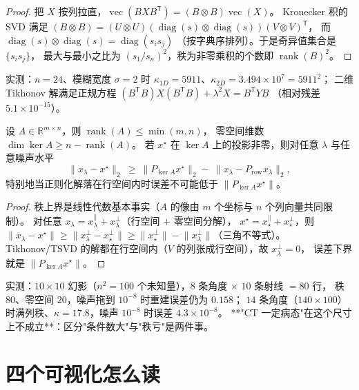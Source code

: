 \begin{proof}
把 $X$ 按列拉直，$\operatorname{vec}(BX B^{\mathsf T})=(B\otimes B)\operatorname{vec}(X)$。
Kronecker 积的 SVD 满足 $(B\otimes B)=(U\otimes U)(\operatorname{diag}(s)\otimes\operatorname{diag}(s))(V\otimes V)^{\mathsf T}$，
而 $\operatorname{diag}(s)\otimes\operatorname{diag}(s)=\operatorname{diag}(s_is_j)$
（按字典序排列）。于是奇异值集合是 $\{s_is_j\}$，
最大与最小之比为 $(s_1/s_n)^2$，秩为非零乘积的个数即 $\operatorname{rank}(B)^2$。
\end{proof}

实测：$n=24$、模糊宽度 $\sigma=2$ 时 $\kappa_{1D}=5911$、$\kappa_{2D}=3.494\times10^7=5911^2$；
二维 Tikhonov 解满足正规方程 $(B^{\mathsf T}B)X(B^{\mathsf T}B)+\lambda^2X=B^{\mathsf T}YB$
（相对残差 $5.1\times10^{-15}$）。

\begin{theorem}[投影算子的秩上界与零空间误差地板]
\label{thm:rank}
设 $A\in\mathbb{R}^{m\times n}$，则 $\operatorname{rank}(A)\le\min(m,n)$，
零空间维数 $\dim\ker A\ge n-\operatorname{rank}(A)$。
若 $x^\star$ 在 $\ker A$ 上的投影非零，则对任意 $\lambda$ 与任意噪声水平
\[
  \lVert x_\lambda-x^\star\rVert_2\ \ge\ \lVert P_{\ker A}x^\star\rVert_2
  -\ \lVert x_\lambda-P_{\operatorname{row}}x_\lambda\rVert_2 ,
\]
特别地当正则化解落在行空间内时误差不可能低于 $\lVert P_{\ker A}x^\star\rVert$。
\end{theorem}

\begin{proof}
秩上界是线性代数基本事实（$A$ 的像由 $m$ 个坐标与 $n$ 个列向量共同限制）。
对任意 $x_\lambda=x_\lambda^{\parallel}+x_\lambda^{\perp}$（行空间 $+$ 零空间分解），
$x^\star=x^{\parallel}_\star+x^\perp_\star$，则
$\lVert x_\lambda-x^\star\rVert\ge\lVert x_\lambda^\perp-x^\perp_\star\rVert
\ge\lVert x^\perp_\star\rVert-\lVert x^\perp_\lambda\rVert$（三角不等式）。
Tikhonov/TSVD 的解都在行空间内（$V$ 的列张成行空间），故 $x^\perp_\lambda=0$，
误差下界就是 $\lVert P_{\ker A}x^\star\rVert$。
\end{proof}

实测：$10\times10$ 幻影（$n^2=100$ 个未知量），$8$ 条角度 $\times$ $10$ 条射线 $=80$ 行，
秩 $80$、零空间 $20$，噪声拖到 $10^{-8}$ 时重建误差仍为 $0.158$；
$14$ 条角度（$140\times100$）时满列秩、$\kappa=17.8$，噪声 $10^{-8}$ 时误差 $4.3\times10^{-8}$。
**"CT 一定病态"在这个尺寸上不成立**：区分"条件数大"与"秩亏"是两件事。

\section{四个可视化怎么读}
\label{sec:read}


